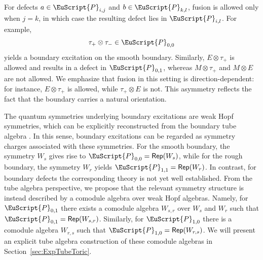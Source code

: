 \documentclass[a4paper,11pt]{article}
\theoremstyle{definition}
\theoremstyle{remark}
\newcommand\eP         {\EuScript{P}}
\newcommand{\Rep}{\mathsf{Rep}}
\begin{document}
For defects $a \in \eP_{i,j}$ and $b \in \eP_{k,l}$, fusion is allowed only when $j = k$, in which case the resulting defect lies in $\eP_{i,l}$. For example,
\begin{equation}
    \tau_+ \otimes \tau_- \in \eP_{0,0}
\end{equation}
yields a boundary excitation on the smooth boundary. Similarly, $E \otimes \tau_+$ is allowed and results in a defect in $\eP_{0,1}$, whereas $M \otimes \tau_+$ and $M \otimes E$ are not allowed. We emphasize that fusion in this setting is direction-dependent: for instance, $E \otimes \tau_+$ is allowed, while $\tau_+ \otimes E$ is not. This asymmetry reflects the fact that the boundary carries a natural orientation.

The quantum symmetries underlying boundary excitations are weak Hopf symmetries, which can be explicitly reconstructed from the boundary tube algebra \cite{Kitaev2012boundary,bridgeman2023invertible,jia2024weakTube,jia2025tube}. In this sense, boundary excitations can be regarded as symmetry charges associated with these symmetries. For the smooth boundary, the symmetry $W_s$ gives rise to $\eP_{0,0} = \Rep(W_s)$, while for the rough boundary, the symmetry $W_r$ yields $\eP_{1,1} = \Rep(W_r)$.
In contrast, for boundary defects the corresponding theory is not yet well established. From the tube algebra perspective, we propose that the relevant symmetry structure is instead described by a comodule algebra over weak Hopf algebras. Namely, for $\eP_{0,1}$ there exists a comodule algebra $W_{s,r}$ over $W_s$ and $W_r$ such that $\eP_{0,1} = \Rep(W_{s,r})$. Similarly, for $\eP_{1,0}$ there is a comodule algebra $W_{r,s}$ such that $\eP_{1,0} = \Rep(W_{r,s})$. We will present an explicit tube algebra construction of these comodule algebras in Section~\ref{sec:ExpTubeToric}.
\end{document}
